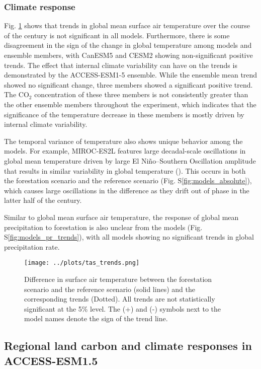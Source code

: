 \documentclass[]{article}
\begin{document}
\subsubsection{Climate response}

Fig. \ref{fig:models_tas_trends} shows that trends in global mean surface air temperature over the course of the century is not significant in all models.
Furthermore, there is some disagreement in the sign of the change in global temperature among models and ensemble members, with CanESM5 and CESM2 showing non-significant positive trends.
The effect that internal climate variability can have on the trends is demonstrated by the ACCESS-ESM1-5 ensemble.
While the ensemble mean trend showed no significant change, three members showed a significant positive trend.
The CO$_2$ concentration of these three members is not consistently greater than the other ensemble members throughout the experiment, which indicates that the significance of the temperature decrease in these members is mostly driven by internal climate variability.

The temporal variance of temperature also shows unique behavior among the models.
For example, MIROC-ES2L features large decadal-scale oscillations in global mean temperature driven by large El Niño–Southern Oscillation amplitude that results in similar variability in global temperature (\cite{hajima_development_2020}).
This occurs in both the forestation scenario and the reference scenario (Fig. S\ref{fig:models_absolute}), which causes large oscillations in the difference as they drift out of phase in the latter half of the century.

Similar to global mean surface air temperature, the response of global mean precipitation to forestation is also unclear from the models (Fig. S\ref{fig:models_pr_trends}), with all models showing no significant trends in global precipitation rate.

\begin{figure}[H]
    \centering
    \texttt{[image: ../plots/tas\_trends.png]}
    \caption{Difference in surface air temperature between the forestation scenario and the reference scenario (solid lines) and the corresponding trends (Dotted). All trends are not statistically significant at the 5\% level. The (+) and (-) symbols next to the model names denote the sign of the trend line.}
    \label{fig:models_tas_trends}
\end{figure}

\subsection{Regional land carbon and climate responses in ACCESS-ESM1.5}
\end{document}
